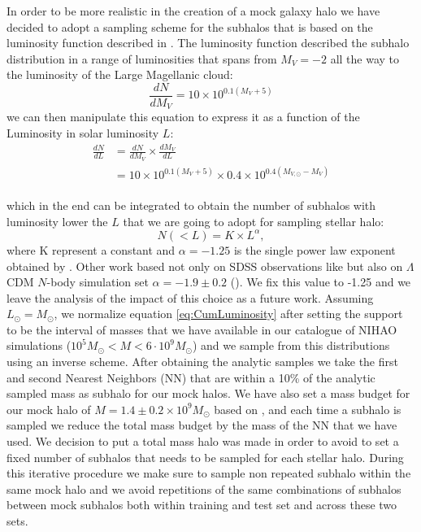 In order to be more realistic in the creation of a mock galaxy halo we have decided to adopt a sampling scheme for the subhalos that is based on the luminosity function described in \cite{koposovLuminosityFunctionMilky2008}. The luminosity function described the subhalo distribution in a range of luminosities that spans from $M_V = -2$ all the way to the luminosity of the Large Magellanic cloud:
\begin{equation}
    \frac{dN}{d M_V} = 10 \times 10^{0.1(M_V + 5)} 
\end{equation}
we can then manipulate this equation to express it as a function of the Luminosity in solar luminosity $L$:
\begin{equation}
\begin{split}
    \frac{dN}{dL} &= \frac{dN}{d M_V} \times \frac{dM_V}{dL} \\
    &= 10 \times 10^{0.1(M_V + 5)} \times 0.4 \times 10^{0.4(M_{V, \odot} - M_V)} \\
\end{split}
\end{equation}

which in the end can be integrated to obtain the number of subhalos with luminosity lower the $L$ that we are going to adopt for sampling stellar halo:
\begin{equation}
    N(<L) = K \times L^{\alpha},
\label{eq:CumLuminosity}
\end{equation}
where K represent a constant and $\alpha=-1.25$ is the single power law exponent obtained by \cite{koposovLuminosityFunctionMilky2008}. Other work based not only on SDSS observations like \cite{koposovLuminosityFunctionMilky2008} but also on $\Lambda$CDM $N$-body simulation set $\alpha = -1.9 \pm 0.2$ (\cite{tollerudHundredsMilkyWay2008}). We fix this value to -1.25 and we leave the analysis of the impact of this choice as a future work.
Assuming $L_\odot = M_\odot$, we normalize equation \ref{eq:CumLuminosity} after setting the support to be the interval of masses that we have available in our catalogue of NIHAO simulations ($10^5 M_\odot < M < 6 \cdot 10^9 M_\odot$) and we sample from this distributions using an inverse scheme. After obtaining the analytic samples we take the first and second Nearest Neighbors (NN) that are within a  
10\% of the analytic sampled mass as subhalo for our mock halos. We have also set a mass budget for our mock halo of $M=1.4 \pm 0.2 \times 10^9 M_\odot$ based on \cite{deasonTotalStellarHalo2019}, and each time a subhalo is sampled we reduce the total mass budget by the mass of the NN that we have used. We decision to put a total mass halo was made in order to avoid to set a fixed number of subhalos that needs to be sampled for each stellar halo. During this iterative procedure we make sure to sample non repeated subhalo within the same mock halo and we avoid repetitions of the same combinations of subhalos between mock subhalos both within training and test set and across these two sets.

